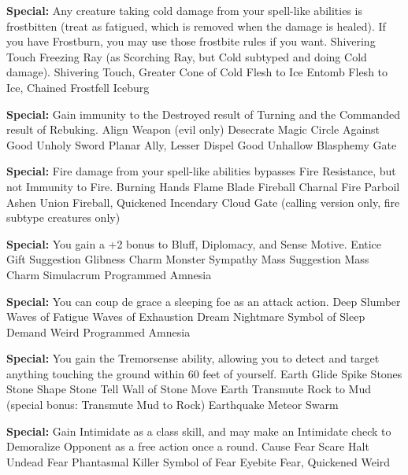 \textbf{Special: }{Any creature taking cold damage from your spell-like abilities is frostbitten (treat as fatigued, which is removed when the damage is healed). If you have Frostburn, you may use those frostbite rules if you want.}
\sphere
{Shivering Touch}
{Freezing Ray (as Scorching Ray, but Cold subtyped and doing Cold damage).}
{Shivering Touch, Greater}
{Cone of Cold}
{Flesh to Ice}
{Entomb}
{Flesh to Ice, Chained}
{Frostfell}
{Iceburg}

\textbf{Special: }{Gain immunity to the Destroyed result of Turning and the Commanded result of Rebuking.}
\sphere
{Align Weapon (evil only)}
{Desecrate}
{Magic Circle Against Good}
{Unholy Sword}
{Planar Ally, Lesser}
{Dispel Good}
{Unhallow}
{Blasphemy}
{Gate}

\textbf{Special: }{Fire damage from your spell-like abilities bypasses Fire Resistance, but not Immunity to Fire.}
\sphere
{Burning Hands}
{Flame Blade}
{Fireball}
{Charnal Fire}
{Parboil}
{Ashen Union}
{Fireball, Quickened}
{Incendary Cloud}
{Gate (calling version only, fire subtype creatures only)}

\textbf{Special: }{You gain a +2 bonus to Bluff, Diplomacy, and Sense Motive.}
\sphere
{Entice Gift}
{Suggestion}
{Glibness}
{Charm Monster}
{Sympathy}
{Mass Suggestion}
{Mass Charm}
{Simulacrum}
{Programmed Amnesia}

\textbf{Special: }{You can coup de grace a sleeping foe as an attack action.}
\sphere
{Deep Slumber}
{Waves of Fatigue}
{Waves of Exhaustion}
{Dream}
{Nightmare}
{Symbol of Sleep}
{Demand}
{Weird}
{Programmed Amnesia}

\textbf{Special: }{You gain the Tremorsense ability, allowing you to detect and target anything touching the ground within 60 feet of yourself.}
\sphere
{Earth Glide}
{Spike Stones}
{Stone Shape}
{Stone Tell}
{Wall of Stone}
{Move Earth}
{Transmute Rock to Mud (special bonus: Transmute Mud to Rock)}
{Earthquake}
{Meteor Swarm}

\textbf{Special: }{Gain Intimidate as a class skill, and may make an Intimidate check to Demoralize Opponent as a free action once a round.}
\sphere
{Cause Fear}
{Scare}
{Halt Undead}
{Fear}
{Phantasmal Killer}
{Symbol of Fear}
{Eyebite}
{Fear, Quickened}
{Weird}

